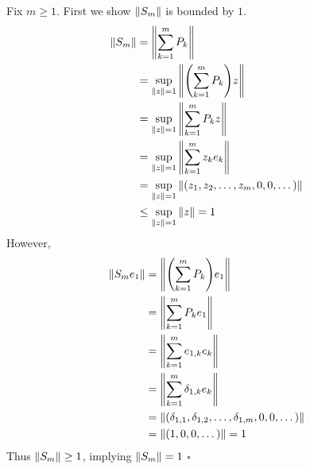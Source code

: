 \documentclass[12pt]{article}
\theoremstyle{plain}
\begin{document}
Fix $m \geq 1$.  First we show $\norm{S_m}$ is bounded by $1$.
\begin{align*}
    \norm{S_m} &= \norm{\sum_{k=1}^m P_k} \\
    &= \sup_{\norm{z}=1}\norm{\qty(\sum_{k=1}^m P_k)z} \\
    &= \sup_{\norm{z}=1}\norm{\sum_{k=1}^m P_kz} \\
    &= \sup_{\norm{z}=1}\norm{\sum_{k=1}^m z_ke_k} \\
    &= \sup_{\norm{z}=1}\norm{(z_1, z_2, \dots, z_m, 0, 0, \dots)} \\
    &\leq \sup_{\norm{z}=1}\norm{z} = 1
\end{align*}
However,
\begin{align*}
    \norm{S_me_1} &= \norm{\qty(\sum_{k=1}^mP_k)e_1} \\
    &= \norm{\sum_{k=1}^mP_ke_1} \\
    &= \norm{\sum_{k=1}^m e_{1,k}e_k} \\
    &= \norm{\sum_{k=1}^m\delta_{1,k}e_k} \\
    &= \norm{(\delta_{1,1}, \delta_{1,2}, \dots, \delta_{1,m}, 0, 0, \dots)} \\
    &= \norm{(1, 0, 0, \dots)} = 1
\end{align*}
Thus $\norm{S_m} \geq 1$, implying $\norm{S_m} = 1$ \hfill $\square$
\end{document}
